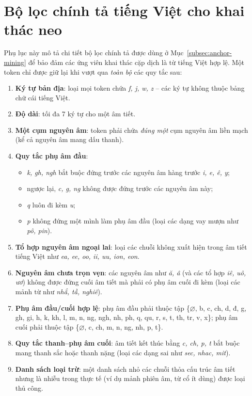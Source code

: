 \chapter{Bộ lọc chính tả tiếng Việt cho khai thác neo}
\label{app:vi-filter}

Phụ lục này mô tả chi tiết bộ lọc chính tả được dùng ở Mục~\ref{subsec:anchor-mining}
để bảo đảm các ứng viên khai thác cặp dịch là từ tiếng Việt hợp lệ. Một token chỉ được
giữ lại khi vượt qua \textit{toàn bộ} các quy tắc sau:

\begin{enumerate}
  \item \textbf{Ký tự bản địa}: loại mọi token chứa \textit{f, j, w, z} -- các ký tự
        không thuộc bảng chữ cái tiếng Việt.
  \item \textbf{Độ dài}: tối đa 7 ký tự cho một âm tiết.
  \item \textbf{Một cụm nguyên âm}: token phải chứa \textit{đúng một} cụm nguyên âm
        liền mạch (kể cả nguyên âm mang dấu thanh).
  \item \textbf{Quy tắc phụ âm đầu}:
        \begin{itemize}
          \item \textit{k, gh, ngh} bắt buộc đứng trước các nguyên âm hàng trước
                \textit{i, e, ê, y};
          \item ngược lại, \textit{c, g, ng} không được đứng trước các nguyên âm này;
          \item \textit{q} luôn đi kèm \textit{u};
          \item \textit{p} không đứng một mình làm phụ âm đầu (loại các dạng vay mượn
                như \textit{pô, pin}).
        \end{itemize}
  \item \textbf{Tổ hợp nguyên âm ngoại lai}: loại các chuỗi không xuất hiện trong âm
        tiết tiếng Việt như \textit{ea, ee, oo, ii, uu, ion, eon}.
  \item \textbf{Nguyên âm chưa trọn vẹn}: các nguyên âm như \textit{ă, â} (và các tổ
        hợp \textit{iê, uô, ươ}) không được đứng cuối âm tiết mà phải có phụ âm cuối
        đi kèm (loại các mảnh từ như \textit{nhắ, tầ, nghiê}).
  \item \textbf{Phụ âm đầu/cuối hợp lệ}: phụ âm đầu phải thuộc tập
        \{$\varnothing$, b, c, ch, d, đ, g, gh, gi, h, k, kh, l, m, n, ng, ngh, nh,
        ph, q, qu, r, s, t, th, tr, v, x\}; phụ âm cuối phải thuộc tập
        \{$\varnothing$, c, ch, m, n, ng, nh, p, t\}.
  \item \textbf{Quy tắc thanh--phụ âm cuối}: âm tiết kết thúc bằng \textit{c, ch, p,
        t} bắt buộc mang thanh sắc hoặc thanh nặng (loại các dạng sai như
        \textit{sec, nhac, mit}).
  \item \textbf{Danh sách loại trừ}: một danh sách nhỏ các chuỗi thỏa cấu trúc âm
        tiết nhưng là nhiễu trong thực tế (ví dụ mảnh phiên âm, từ cổ ít dùng) được
        loại thủ công.
\end{enumerate}

